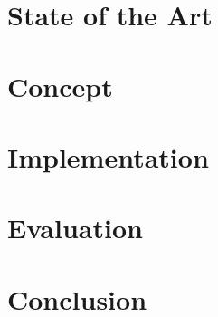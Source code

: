 \documentclass[twoside,a4paper,11pt,openright]{report}
\begin{document}
%
%




%



\cleardoublepage


\cleardoublepage


\tableofcontents

\cleardoublepage





%
%

\cleardoublepage
{}


\clearpage

\chapter{State of the Art} \label{chap:stateoftheart}





\chapter{Concept} \label{chap:concept}



\chapter{Implementation} \label{chap:implementation}




\chapter{Evaluation} \label{chap:evaluation}



\chapter{Conclusion} \label{chap:conclusion}
\end{document}
